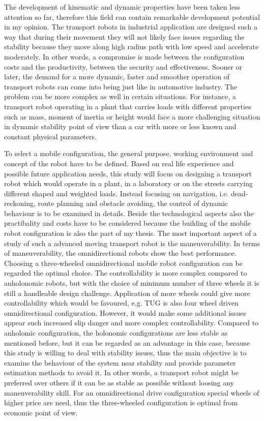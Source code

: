 \documentclass[12pt,english]{article}
\begin{document}
The development of kinematic and dynamic properties have been taken less attention so far, therefore this field can contain remarkable development potential in my opinion. The transport robots in industrial application are designed such a way that during their movement they will not likely face issues regarding the stability because they move along
high radius path with low speed and accelerate moderately. In other words, a compromise is made between the configuration costs and the productivity, between the security and effectiveness. Sooner or later, the demand for a more dynamic, faster and smoother operation of transport robots can come into being just like in automotive industry. The problem can be more complex as well in certain situations. For instance, a transport robot operating in a plant that carries loads with different properties such as mass, moment of inertia or height would face a more challenging situation in dynamic stability point of view than a car with more or less known and constant physical parameters.

To select a mobile configuration, the general purpose, working environment and concept of the robot have to be defined. Based on real life experience and possible future application needs, this study will focus on designing a transport robot which would operate in a plant, in a laboratory or on the streets carrying different shaped and weighted loads. Instead focusing on navigation, i.e. dead-reckoning, route planning and obstacle avoiding, the control of dynamic behaviour is to be examined in details. Beside the technological aspects also the practibality and costs have to be considered because the building of the mobile robot configuration is also the part of my thesis. The most important aspect of a study of such a advanced moving transport robot is the maneuverability. In terms of maneuverability, the omnidirectional robots show the best performance. Choosing a three-wheeled omnidirectional mobile robot configuration can be regarded the optimal choice. The controllability is more complex compared to anholonomic robots, but with the choice of minimum number of three wheels it is still a handleable design challenge. Application of more wheels could give more controllability which would be favoured, e.g. TUG is also four wheel driven omnidirectional configuration. However, it would make some additional issues appear such increased slip danger and more complex controllability. Compared to anholomic configuration, the holonomic configurations are less stable as mentioned before, but it can be regarded as an advantage in this case, because this study is willing to deal with stability issues, thus the main objective is to examine the behaviour of the system near stability and provide parameter estimation methods to avoid it.
In other words, a transport robot might be preferred over others if it can be as stable as possible without loosing any maneuverability skill. For an omnidirectional drive configuration special wheels of higher price are need, thus the three-wheeled configuration is optimal from economic point of view.
\newpage
\end{document}
